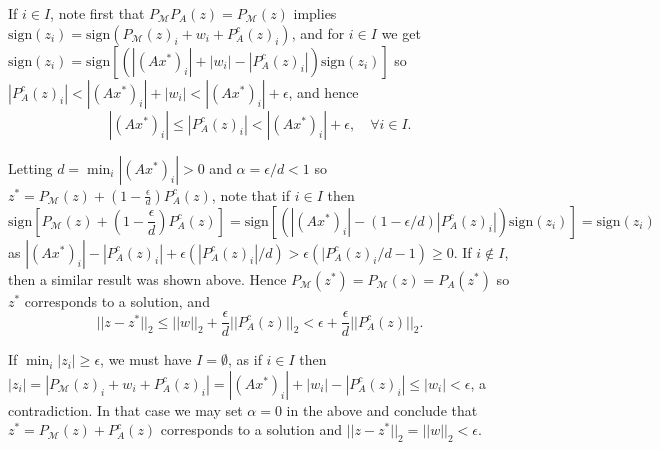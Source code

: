\documentclass[journal]{IEEEtran}
\theoremstyle{definition}
\theoremstyle{remark}
\theoremstyle{definition}
\theoremstyle{problem}
\theoremstyle{definition}
\newcommand{\sign}{\text{sign}}
\newcommand{\MM}{\mathcal{M}}
\begin{document}
If $i\in I$, note first that $P_{\MM}P_A(z) = P_{\MM}(z)$ implies $\sign(z_i) = \sign(P_{\MM}(z)_i+w_i+P_A^c(z)_i)$, and for $i\in I$ we get $\sign(z_i) = \sign\left[(|(Ax^*)_i| + |w_i| - |P_A^c(z)_i|)\sign(z_i)\right]$ so $|P_A^c(z)_i|<|(Ax^*)_i| + |w_i|< |(Ax^*)_i| + \epsilon$, and hence
\[|(Ax^*)_i|\leq |P_A^c(z)_i|<|(Ax^*)_i| + \epsilon,\quad \forall i\in I.\]

Letting $d = \min_i|(Ax^*)_i| > 0$ and $\alpha = \epsilon/d<1$ so $z^* = P_{\MM}(z) + (1-\frac{\epsilon}{d})P_A^c(z)$, note that if $i\in I$ then
\[\sign\left[P_{\MM}(z) + (1-\frac{\epsilon}{d})P_A^c(z)\right] = \sign\left[(|(Ax^*)_i|-(1-\epsilon/d)|P_A^c(z)_i|)\sign(z_i)\right] = \sign(z_i)\]
as $|(Ax^*)_i|-|P_A^c(z)_i|+\epsilon(|P_A^c(z)_i|/d)>\epsilon\left(|P_A^c(z)_i/d - 1\right) \geq 0$. If $i\notin I$, then a similar result was shown above. Hence $P_{\MM}(z^*)=P_{\MM}(z) = P_A(z^*)$ so $z^*$ corresponds to a solution, and
\[||z-z^*||_2 \leq ||w||_2 + \frac{\epsilon}{d}||P_A^c(z)||_2 < \epsilon + \frac{\epsilon}{d}||P_A^c(z)||_2.\]

If $\min_i|z_i|\geq\epsilon$, we must have $I=\emptyset$, as if $i\in I$ then $|z_i| = |P_{\MM}(z)_i+w_i+P_A^c(z)_i|=|(Ax^*)_i| + |w_i| - |P_A^c(z)_i|\leq |w_i|<\epsilon$, a contradiction. In that case we may set $\alpha=0$ in the above and conclude that $z^* = P_{\MM}(z) + P_A^c(z)$ corresponds to a solution and $||z-z^*||_2 = ||w||_2<\epsilon$. 
\end{document}
